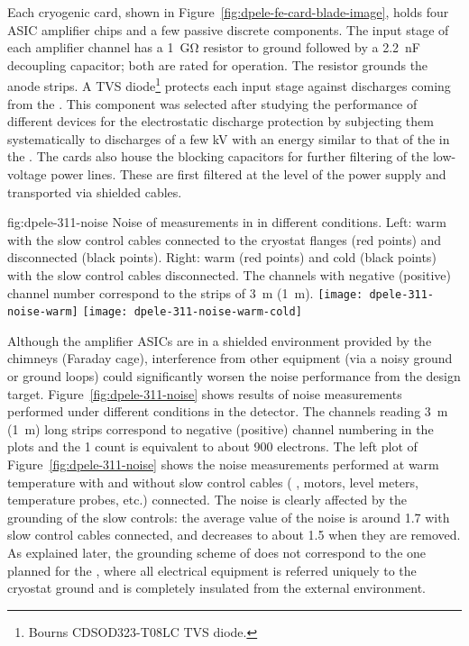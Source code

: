 Each cryogenic  card, shown in Figure~\ref{fig:dpele-fe-card-blade-image}, %
holds four ASIC amplifier chips and a few passive discrete components. The input stage of each amplifier channel has a \SI{1}{\giga\ohm} resistor to ground followed by a \SI{2.2}{\nano\farad} decoupling capacitor; both are rated for  operation. The %
resistor grounds the  anode strips. A TVS diode\footnote{Bourns\texttrademark{} CDSOD323-T08LC TVS diode.} protects each input stage against discharges coming from the . This component was selected after studying the performance of different devices for the electrostatic discharge protection by subjecting them systematically to discharges of a few \si{kV} with an energy similar to that of the  in the . The  cards also house the blocking capacitors for further filtering of the low-voltage power lines. These are first filtered at the level of the power supply and transported via shielded cables.

\begin{dunefigure}{fig:dpele-311-noise}
{Noise of measurements in  in different conditions. Left: warm with the slow control cables connected to the cryostat flanges (red points) and disconnected (black points). Right: warm (red points) and cold (black points) with the slow control cables disconnected. The channels with negative (positive) channel number correspond to the strips of \SI{3}{\meter} (\SI{1}{\meter}).}
\texttt{[image: dpele-311-noise-warm]}
\texttt{[image: dpele-311-noise-warm-cold]}
\end{dunefigure}

Although the  amplifier ASICs are in a shielded environment provided by the chimneys (Faraday cage),
 interference from other equipment (via a noisy ground or ground loops) could significantly worsen the noise performance from the design target. Figure~\ref{fig:dpele-311-noise} shows %
results of %
noise measurements performed under different conditions in the  detector. The channels reading \SI{3}{\meter} (\SI{1}{\metre}) long strips correspond to negative (positive) channel numbering in the plots and the \num{1}  count is equivalent to about \num{900} electrons. The left plot of Figure~\ref{fig:dpele-311-noise} shows the noise measurements performed at warm temperature with and without slow control cables ( ,  motors, level meters, temperature probes, etc.) connected. 
The noise is clearly affected by the grounding of the slow controls: the average value of the noise \rms is around \num{1.7}  with slow control cables connected, and decreases to about \num{1.5}  when they are removed. As explained later,
 the grounding scheme of  does not correspond to the one %
planned for the , where all electrical equipment is referred uniquely to the cryostat ground and is completely insulated from the external environment. 

